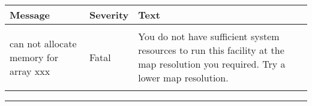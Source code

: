 \newpage
\begin{messages}
{
\begin{tabular}{p{0.25\hsize} p{0.1\hsize} p{0.35\hsize}} \hline  
  \textbf{Message} & \textbf{Severity} & \textbf{Text} \\ \hline
                   &                   &   \\ %
can not allocate memory for array xxx &  Fatal & You do not have
                   sufficient system resources to run this
                   facility at the map resolution you required. 
  Try a lower map resolution.  \\ 
                   &                   &   \\ \hline %
\end{tabular}
} 
\end{messages}

\rule{\hsize}{2mm}

\newpage

